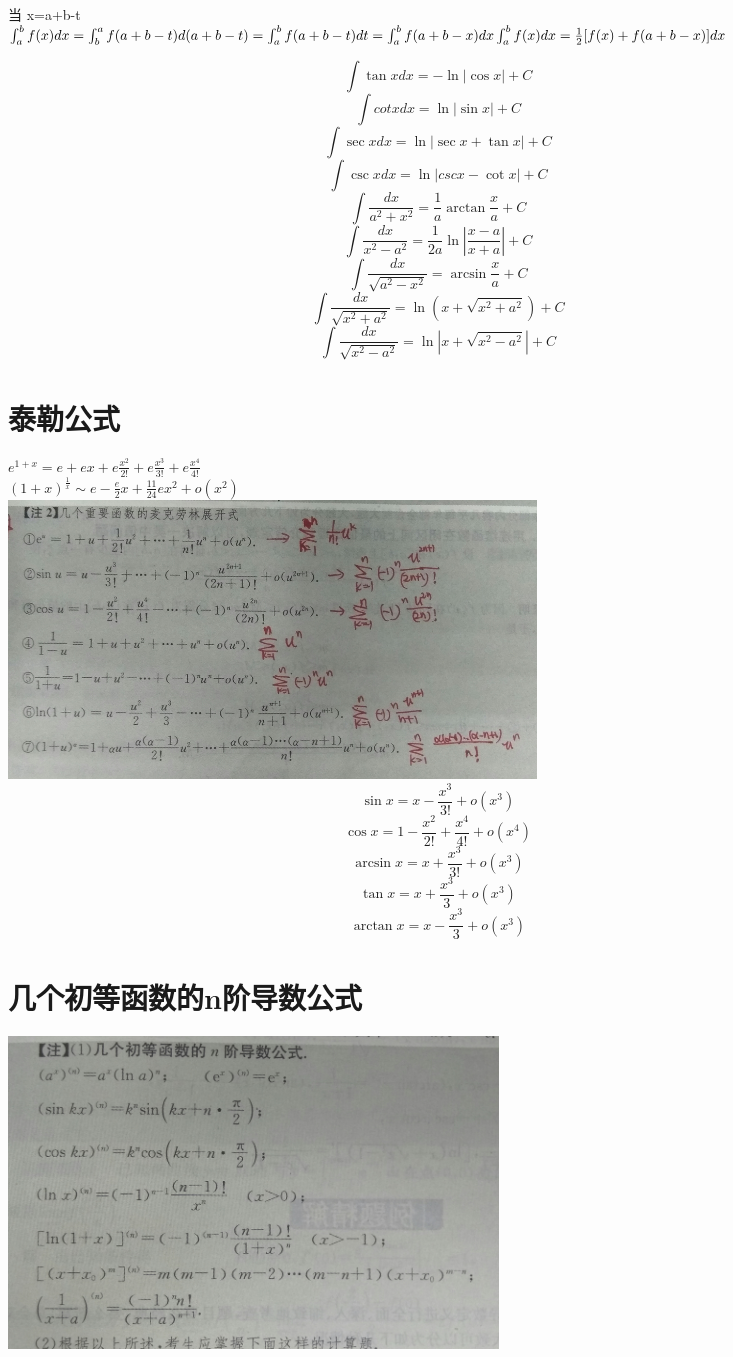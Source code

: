\documentclass[UTF8]{ctexart}
\begin{document}
当 x=a+b-t \\
$ \int_a^b f(x) dx = \int_b^a f(a+b-t)d(a+b-t)=\int_a^bf(a+b-t)dt=\int_a^b f(a+b-x) dx \\
\int_a^b f(x) dx = \frac{1}{2} [ f(x) + f(a+b-x) ] dx$

$$ \int \tan x dx = - \ln |\cos x | +C$$
$$ \int cot x dx = \ln|\sin x| +C$$
$$ \int \sec x dx = \ln |\sec x+ \tan x| +C$$
$$ \int \csc x dx = \ln|csc x-\cot x | +C $$
$$ \int \frac{dx}{a^2+x^2}=\frac{1}{a} \arctan \frac{x}{a} +C $$
$$ \int \frac{dx}{x^2-a^2}=\frac{1}{2a} \ln \left| \frac{x-a}{x+a} \right| +C$$
$$ \int \frac{dx}{\sqrt{a^2-x^2}}=\arcsin \frac{x}{a}+C$$
$$ \int \frac {dx}{\sqrt{x^2+a^2}}=\ln {(x+ \sqrt{x^2+a^2})}+C$$
$$ \int \frac{dx}{\sqrt{x^2-a^2}}= \ln | x+\sqrt{x^2-a^2}|+C$$

\section{泰勒公式}
$ e^{1+x}=e+ex+e \frac{x^2}{2!} + e \frac{x^3}{3!}+e\frac{x^4}{4!}$ \\
$ (1+x)^{\frac{1}{x}} \sim e-\frac{e}{2}x+\frac{11}{24}ex^2+o(x^2)$ \\
\includegraphics[width=14cm]{9345E7/F04F85A8EB6EABFF18D6BE71383F2472.jpg}
$$ \sin x=x-\frac{x^3}{3!}+o(x^3)$$
$$ \cos x=1-\frac{x^2}{2!}+\frac{x^4}{4!}+o(x^4)$$
$$ \arcsin x=x+\frac{x^3}{3!}+o(x^3)$$
$$ \tan x=x+\frac{x^3}{3}+o(x^3)$$
$$ \arctan x=x-\frac{x^3}{3}+o(x^3)$$

\section{几个初等函数的n阶导数公式}
\includegraphics[width=13cm]{9345E7/2A793F093B002F668B144F9ED087EB77.jpg}
\end{document}
